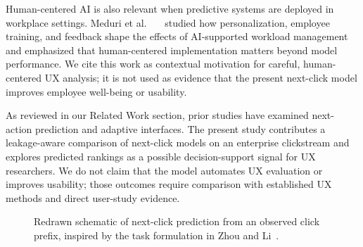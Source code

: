 \documentclass[sn-mathphys-num, Numbered]{sn-jnl}%
\theoremstyle{thmstyleone}%
\theoremstyle{thmstyletwo}%
\theoremstyle{thmstylethree}%
\providecommand{\DIFadd}[1]{{\protect\color{green!40!black}#1}} %
\providecommand{\DIFdel}[1]{}                      %
\providecommand{\DIFaddbegin}{} %
\providecommand{\DIFaddend}{} %
\providecommand{\DIFdelbegin}{} %
\providecommand{\DIFdelend}{} %
\newcommand{\DIFscaledelfig}{0.5}
\newlength{\DIFdelgraphicswidth} %
\newlength{\DIFdelgraphicsheight} %
\newcommand{\DIFaddincludegraphics}[2][]{{\color{blue}\fbox{\DIFOincludegraphics[#1]{#2}}}} %
\newcommand{\DIFdelincludegraphics}[2][]{%
\sbox{\DIFdelgraphicsbox}{\DIFOincludegraphics[#1]{#2}}%
\settoboxwidth{\DIFdelgraphicswidth}{\DIFdelgraphicsbox} %
\settoboxtotalheight{\DIFdelgraphicsheight}{\DIFdelgraphicsbox} %
\scalebox{\DIFscaledelfig}{%
\parbox[b]{\DIFdelgraphicswidth}{\usebox{\DIFdelgraphicsbox}\\[-\baselineskip] \rule{\DIFdelgraphicswidth}{0em}}\llap{\resizebox{\DIFdelgraphicswidth}{\DIFdelgraphicsheight}{%
\setlength{\unitlength}{\DIFdelgraphicswidth}%
\begin{picture}(1,1)%
\thicklines\linethickness{2pt} %
{\color[rgb]{1,0,0}\put(0,0){\framebox(1,1){}}}%
{\color[rgb]{1,0,0}\put(0,0){\line( 1,1){1}}}%
{\color[rgb]{1,0,0}\put(0,1){\line(1,-1){1}}}%
\end{picture}%
}\hspace*{3pt}}} %
} %
\DeclareRobustCommand{\DIFaddbegin}{\DIFOaddbegin \let\includegraphics\DIFaddincludegraphics} %
\DeclareRobustCommand{\DIFaddend}{\DIFOaddend \let\includegraphics\DIFOincludegraphics} %
\DeclareRobustCommand{\DIFdelbegin}{\DIFOdelbegin \let\includegraphics\DIFdelincludegraphics} %
\DeclareRobustCommand{\DIFdelend}{\DIFOaddend \let\includegraphics\DIFOincludegraphics} %
\begin{document}
\DIFadd{Human-centered AI is also relevant when predictive systems are deployed in workplace settings. Meduri }\DIFaddend et al.\DIFdelbegin \DIFdel{\mbox{%
\cite{sun2022meta}}\hskip0pt%
, and Zhou and Li \mbox{%
\cite{zhou2021large}}\hskip0pt%
?have incorporated UX testing methods to improve user experience or proposed an intelligent assistant to support }\DIFdelend \DIFaddbegin \DIFadd{~\mbox{%
\cite{meduri2024human} }\hskip0pt%
studied how personalization, employee training, and feedback shape the effects of AI-supported workload management and emphasized that human-centered implementation matters beyond model performance. We cite this work as contextual motivation for careful, human-centered UX analysis; it is not used as evidence that the present next-click model improves employee well-being or usability.
}


\DIFadd{As reviewed in our Related Work section, prior studies have examined next-action prediction and adaptive interfaces. The present study contributes a leakage-aware comparison of next-click models on an enterprise clickstream and explores predicted rankings as a possible decision-support signal for }\DIFaddend UX researchers. \DIFdelbegin \DIFdel{Our model uniquely leverages user click data not only for predictive modeling but also to automate UX evaluations and support data-driven decision-making in UX design.
This gap in the literature highlights the novelty of our contribution.

}\DIFdelend \DIFaddbegin \DIFadd{We do not claim that the model automates UX evaluation or improves usability; those outcomes require comparison with established UX methods and direct user-study evidence.
}\DIFaddend 


\begin{figure}
	\centering
{}
\caption{Redrawn schematic of next-click prediction from an observed click prefix, inspired by the task formulation in Zhou and Li~\cite{zhou2021large}.}
	\label{fig:examplecontacts}
\end{figure}
\end{document}
